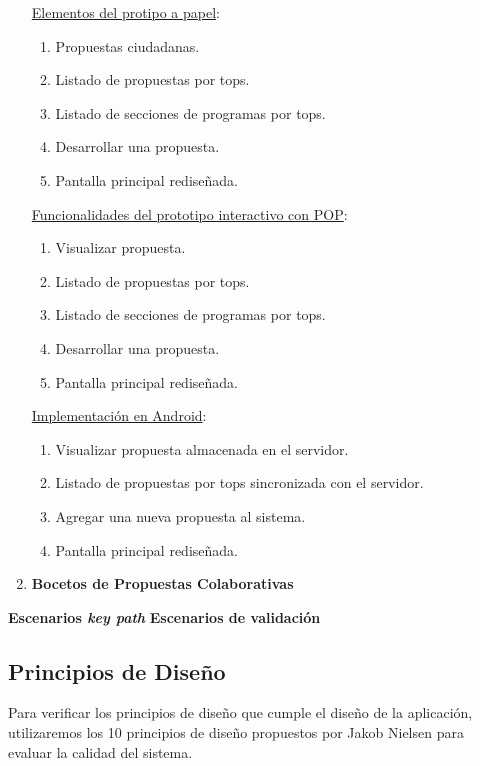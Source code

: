 \begin{enumerate}
\underline{Elementos del protipo a papel}:

\begin{enumerate}
 \item Propuestas ciudadanas.
 \item Listado de propuestas por tops.
 \item Listado de secciones de programas por tops.
 \item Desarrollar una propuesta.
 \item Pantalla principal rediseñada.
\end{enumerate}

\underline{Funcionalidades del prototipo interactivo con POP}:

\begin{enumerate}
 \item Visualizar propuesta.
 \item Listado de propuestas por tops.
 \item Listado de secciones de programas por tops.
 \item Desarrollar una propuesta.
 \item Pantalla principal rediseñada.
\end{enumerate}

\underline{Implementación en Android}:

\begin{enumerate}
 \item Visualizar propuesta almacenada en el servidor.
 \item Listado de propuestas por tops sincronizada con el servidor.
 \item Agregar una nueva propuesta al sistema.
 \item Pantalla principal rediseñada.
\end{enumerate}

\item \textbf{Bocetos de Propuestas Colaborativas}

\end{enumerate}

\textbf{Escenarios \textit{key path}}
\textbf{Escenarios de validación}

\subsection{Principios de Diseño}

Para verificar los principios de diseño que cumple el diseño de la aplicación, utilizaremos los 10 principios de diseño propuestos por Jakob Nielsen \cite{ref:nielsen} para evaluar la calidad del sistema.

